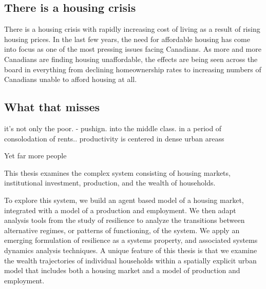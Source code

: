 \subsection{There is a housing crisis}  %
There is a housing crisis with rapidly increasing cost of living as a result of rising housing prices. 
In the last few years, the need for affordable housing has come into focus as one of the most pressing issues facing Canadians. As more and more Canadians are finding housing unaffordable, the effects are being seen across the board in everything from declining homeownership rates to increasing numbers of Canadians unable to afford housing at all.



\subsection{What that misses}

 it's not only the poor. - pushign. into the middle class. %
in a period of consolodation of rents..
productivity is centered in dense urban areass

Yet far more people





This thesis examines the complex system consisting of  housing markets, institutional investment, production, and the wealth of households.

To explore this system, we build an agent based model of a housing market, integrated with a model of a production and employment. We then adapt analysis tools from the study of resilience to analyze the transitions between alternative regimes, or patterns of functioning, of the system. We apply an emerging formulation of resilience as a systems property, and associated systems dynamics analysis techniques. A unique feature of this thesis is that we examine the wealth trajectories of individual households within a spatially explicit urban model that includes both a housing market and a model of production and employment. 


